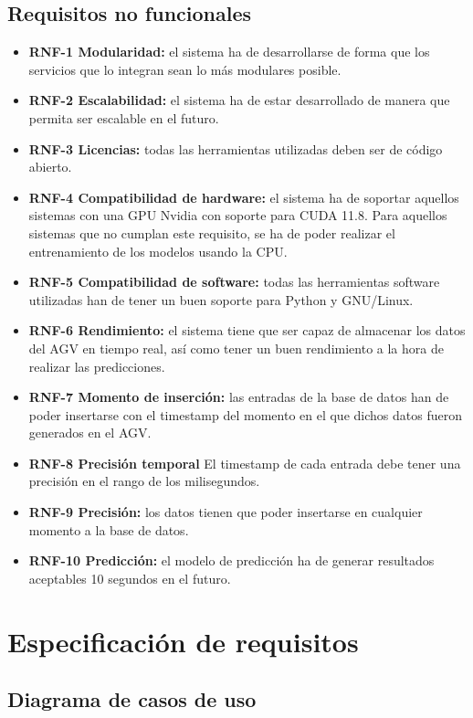 \subsection{Requisitos no funcionales}
\begin{itemize}
	\item \textbf{RNF-1 Modularidad:} el sistema ha de desarrollarse de forma que los servicios que lo integran sean lo más 
		modulares posible.
	\item \textbf{RNF-2 Escalabilidad:} el sistema ha de estar desarrollado de manera que permita ser escalable en el futuro.
	\item \textbf{RNF-3 Licencias:} todas las herramientas utilizadas deben ser de código abierto.
	\item \textbf{RNF-4 Compatibilidad de hardware:} el sistema ha de soportar aquellos sistemas con una GPU Nvidia con soporte para CUDA
		11.8. Para aquellos sistemas que no cumplan este requisito, se ha de poder realizar el entrenamiento de los modelos
		usando la CPU.
	\item \textbf{RNF-5 Compatibilidad de software:} todas las herramientas software utilizadas han de tener un buen soporte
		para Python y GNU/Linux.
	\item \textbf{RNF-6 Rendimiento:} el sistema tiene que ser capaz de almacenar los datos del AGV en tiempo real, así como
		tener un buen rendimiento a la hora de realizar las predicciones.
	\item \textbf{RNF-7 Momento de inserción:} las entradas de la base de datos han de poder insertarse con el timestamp del momento
		en el que dichos datos fueron generados en el AGV. 
    \item \textbf{RNF-8 Precisión temporal} El timestamp de cada entrada debe tener una precisión en el rango de
        los milisegundos.
	\item \textbf{RNF-9 Precisión:} los datos tienen que poder insertarse en cualquier momento a la base de datos.
	\item \textbf{RNF-10 Predicción:} el modelo de predicción ha de generar resultados aceptables 10 segundos en el futuro.
\end{itemize}

\section{Especificación de requisitos}

\subsection{Diagrama de casos de uso}

